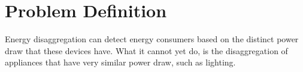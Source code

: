 

\section{Problem Definition}

Energy disaggregation can detect energy consumers based on the distinct power draw that these devices have.
What it cannot yet do, is the disaggregation of appliances that have very similar power draw, such as lighting.
